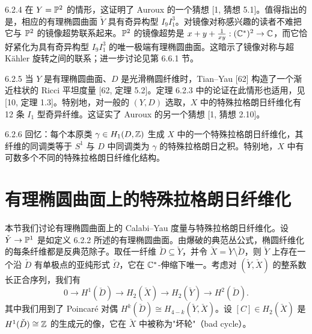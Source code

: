 \begin{remark}{6.2.4}
在 $Y=\mathbb{P}^2$ 的情形，这证明了 Auroux 的一个猜想 [1, 猜想 5.1]。值得指出的是，相应的有理椭圆曲面 $\check Y$ 具有奇异构型 $I_9I_1^3$。对镜像对称感兴趣的读者不难把它与 $\mathbb{P}^2$ 的镜像超势联系起来。$\mathbb{P}^2$ 的镜像超势是 $x+y+\frac{1}{xy}:(\mathbb{C}^*)^2\to\mathbb{C}$，而它恰好紧化为具有奇异构型 $I_9I_1^3$ 的唯一极端有理椭圆曲面。这暗示了镜像对称与超 Kähler 旋转之间的联系；进一步讨论见第 6.6.1 节。
\end{remark}

\begin{remark}{6.2.5}
当 $Y$ 是有理椭圆曲面、$D$ 是光滑椭圆纤维时，Tian--Yau [62] 构造了一个渐近柱状的 Ricci 平坦度量 [62, 定理 5.2]。定理 6.2.3 中的论证在此情形也适用，见 [10, 定理 1.3]。特别地，对一般的 $(Y,D)$ 选取，$X$ 中的特殊拉格朗日纤维化有 12 条 $I_1$ 型奇异纤维。这证实了 Auroux 的另一个猜想 [1, 猜想 2.10]。
\end{remark}

\begin{remark}{6.2.6}
回忆：每个本原类 $\gamma\in H_1(D,\mathbb{Z})$ 生成 $X$ 中的一个特殊拉格朗日纤维化，其纤维的同调类等于 $S^1$ 与 $D$ 中同调类为 $\gamma$ 的特殊拉格朗日之积。特别地，$X$ 中有可数多个不同的特殊拉格朗日纤维化结构。
\end{remark}

\section{有理椭圆曲面上的特殊拉格朗日纤维化}
本节我们讨论有理椭圆曲面上的 Calabi--Yau 度量与特殊拉格朗日纤维化。设 $\check Y\to\mathbb{P}^1$ 是如定义 6.2.2 所述的有理椭圆曲面。由爆破的典范丛公式，椭圆纤维化的每条纤维都是反典范除子。取任一纤维 $\check D\subseteq\check Y$，并令 $\check X=\check Y\setminus\check D$，则 $\check Y$ 上存在一个沿 $\check D$ 有单极点的亚纯形式 $\check\Omega$，它在 $\mathbb{C}^*$-伸缩下唯一。考虑对 $(\check Y,\check X)$ 的整系数长正合序列，我们有
\begin{equation}
0\to H^1(\check D)\to H_2(\check X)\to H_2(\check Y)\to H^2(\check D).
\tag{6.3.1}
\end{equation}
其中我们用到了 Poincaré 对偶 $H^k(\check D)\cong H_{4-k}(\check Y,\check X)$。设 $[C]\in H_2(\check X)$ 是 $H^1(\check D)\cong\mathbb{Z}$ 的生成元的像，它在 $\check X$ 中被称为"坏轮"（bad cycle）。
